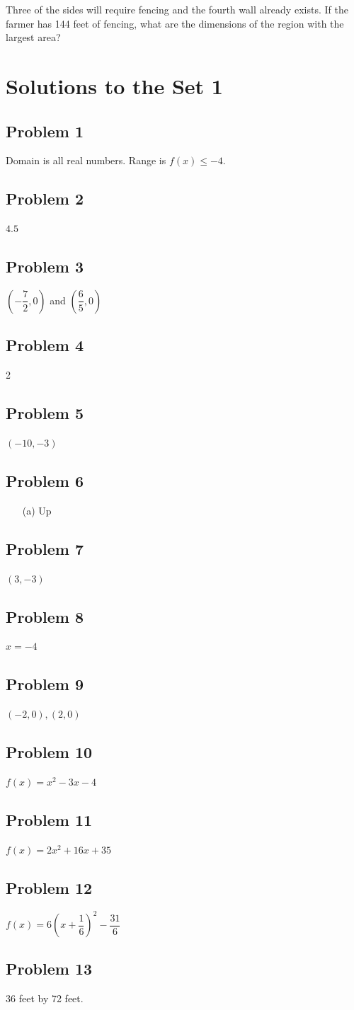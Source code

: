 \documentclass[12pt]{article}
\begin{document}
Three of the sides will require fencing and the fourth wall already exists. If the farmer has 144 feet of fencing, what are the dimensions of the region with the largest area?

\newpage
\section*{Solutions to the Set 1}
\subsection*{Problem 1}
Domain is all real numbers. Range is \(f(x) \leq -4\).
\subsection*{Problem 2}
\(4.5\)
\subsection*{Problem 3}
\((-\dfrac{7}{2},0)\) and \((\dfrac{6}{5},0)\)
\subsection*{Problem 4}
2
\subsection*{Problem 5}
\((-10,-3)\)
\subsection*{Problem 6}
\begin{enumerate}
    \item[(a)] Up 
\end{enumerate}
\subsection*{Problem 7}
\((3,-3)\)
\subsection*{Problem 8}
\(x=-4\)
\subsection*{Problem 9}
\((-2,0),(2,0)\)
\subsection*{Problem 10}
\(f(x)=x^2-3x-4\)
\subsection*{Problem 11}
\(f(x)=2x^2+16x+35\)
\subsection*{Problem 12}
\(f(x)=6(x+\dfrac{1}{6})^2-\dfrac{31}{6}\)
\subsection*{Problem 13}
36 feet by 72 feet.
\end{document}
